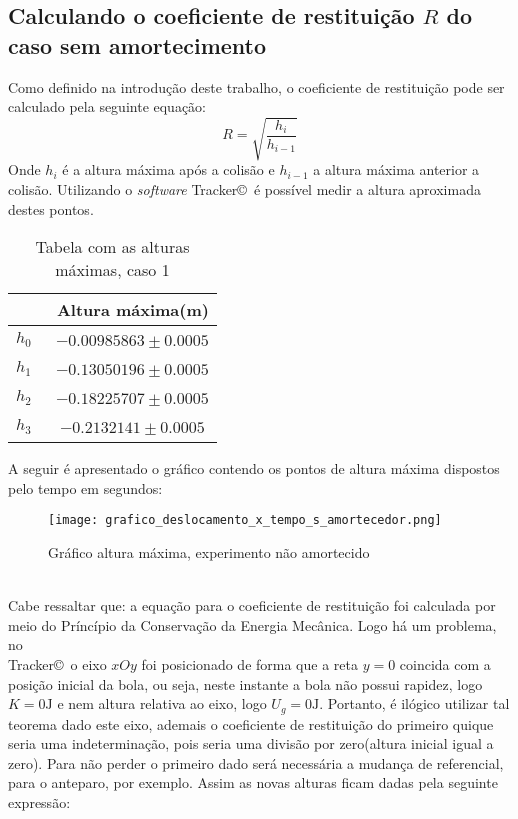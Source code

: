 \documentclass[a4paper, 12pt]{article}
\begin{document}
		\subsection{Calculando o coeficiente de restituição $R$ do caso sem amortecimento}
		Como definido na introdução deste trabalho, o coeficiente de restituição pode ser calculado pela seguinte equação: 
		$$R= \sqrt{\dfrac{h_i}{h_{i-1}}}$$
		Onde  $h_i$ é a altura máxima após a colisão e $h_{i-1}$ a altura máxima anterior a colisão. Utilizando o \textsl{software} Tracker\copyright \, é possível medir a altura aproximada destes pontos.
		\begin{table}[H]
			\centering
			\begin{tabular}{c|c}
				\hline \,  & \ Altura máxima(m) \\
				\hline $h_0$ & \ $-0.00985863 \pm 0.0005$ \\
				\hline $h_1$ & \ $-0.13050196 \pm 0.0005$\\
				\hline $h_2$ & \ $-0.18225707 \pm 0.0005$\\
				\hline $h_3$ & \ $-0.2132141 \pm 0.0005$\\
				\hline
			\end{tabular}	
			\caption{Tabela com as alturas máximas, caso 1}
			\label{tcm}		
		\end{table}
		\noindent A seguir é apresentado o gráfico contendo os pontos de altura máxima dispostos pelo tempo em segundos:
		\begin{figure}[htb]
			\centering
			\texttt{[image: grafico\_deslocamento\_x\_tempo\_s\_amortecedor.png]}
			\caption{Gráfico altura máxima, experimento não amortecido}
			\label{g1}
		\end{figure} \\
		Cabe ressaltar que: a equação para o coeficiente de restituição foi calculada por meio do Príncípio da Conservação da Energia Mecânica. Logo há um problema, no \\ Tracker\copyright \, o eixo $xOy$ foi posicionado de forma que a reta $y=0$ coincida com a posição inicial da bola, ou seja, neste instante a bola não possui rapidez, logo $K=0 \mathrm{J}$ e nem altura relativa ao eixo, logo $U_g = 0 \mathrm{J}$. Portanto, é ilógico utilizar tal teorema dado este eixo, ademais o coeficiente de restituição do primeiro quique seria uma indeterminação, pois seria uma divisão por zero(altura inicial igual a zero). Para não perder o primeiro dado será necessária a mudança de referencial, para o anteparo, por exemplo. Assim as novas alturas ficam dadas pela seguinte expressão:
\end{document}
